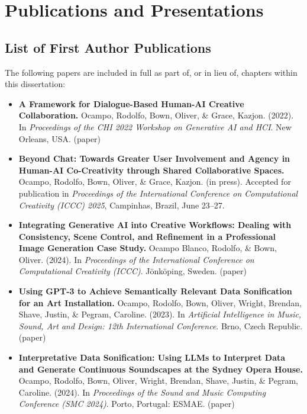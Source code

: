 \chapter{Publications and Presentations}

\section*{List of First Author Publications}

The following papers are included in full as part of, or in lieu of, chapters within this dissertation:

\begin{itemize}

\item \textbf{A Framework for Dialogue-Based Human-AI Creative Collaboration.} Ocampo, Rodolfo, Bown, Oliver, \& Grace, Kazjon. (2022). In \textit{Proceedings of the CHI 2022 Workshop on Generative AI and HCI}. New Orleans, USA. (paper)

\item \textbf{Beyond Chat: Towards Greater User Involvement and Agency in Human-AI Co-Creativity through Shared Collaborative Spaces.} Ocampo, Rodolfo, Bown, Oliver, \& Grace, Kazjon. (in press). Accepted for publication in \textit{Proceedings of the International Conference on Computational Creativity (ICCC) 2025}, Campinhas, Brazil, June 23–27.

\item \textbf{Integrating Generative AI into Creative Workflows: Dealing with Consistency, Scene Control, and Refinement in a Professional Image Generation Case Study.} Ocampo Blanco, Rodolfo, \& Bown, Oliver. (2024). In \textit{Proceedings of the International Conference on Computational Creativity (ICCC)}. Jönköping, Sweden. (paper)

\item \textbf{Using GPT-3 to Achieve Semantically Relevant Data Sonification for an Art Installation.} Ocampo, Rodolfo, Bown, Oliver, Wright, Brendan, Shave, Justin, \& Pegram, Caroline. (2023). In \textit{Artificial Intelligence in Music, Sound, Art and Design: 12th International Conference}. Brno, Czech Republic. (paper)

\item \textbf{Interpretative Data Sonification: Using LLMs to Interpret Data and Generate Continuous Soundscapes at the Sydney Opera House.} Ocampo, Rodolfo, Bown, Oliver, Wright, Brendan, Shave, Justin, \& Pegram, Caroline. (2024). In \textit{Proceedings of the Sound and Music Computing Conference (SMC 2024)}. Porto, Portugal: ESMAE. (paper)

\end{itemize}



